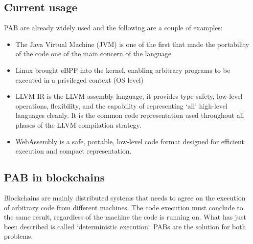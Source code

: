 \documentclass[../main.tex]{subfiles}
\begin{document}
\subsection{Current usage}

PAB are already widely used and the following are a couple of examples:

\begin{itemize}
  \item
        The Java Virtual Machine (JVM) is one of the first that made the portability of the code one of the main concern of the language
  \item
        Linux brought eBPF into the kernel, enabling arbitrary programs to be executed in a privileged context (OS level)
  \item
        LLVM IR is the LLVM assembly language, it provides type safety, low-level operations, flexibility, and the capability of representing ‘all’ high-level languages cleanly. It is the common code representation used throughout all phases of the LLVM compilation strategy. ~\cite{LLVM}
  \item
        WebAssembly is a safe, portable, low-level code format designed for efficient execution and compact representation. ~\cite{wasm-core-spec}
\end{itemize}

\subsection{PAB in blockchains}

Blockchains are mainly distributed systems that needs to agree on the execution of arbitrary code from different machines. The code execution must conclude to the same result, regardless of the machine the code is running on. What has just been described is called `deterministic execution`. PABs are the solution for both problems.
\end{document}
